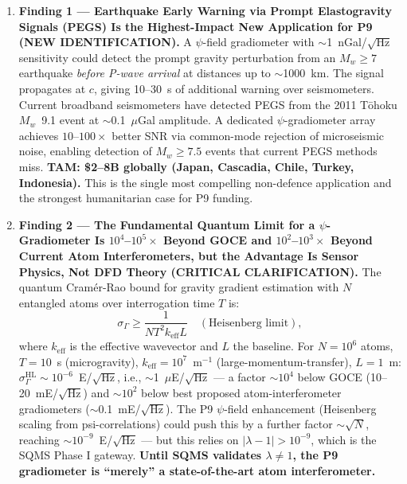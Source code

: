 \documentclass[11pt]{article}
\theoremstyle{definition}
\theoremstyle{remark}
\begin{document}
\begin{enumerate}
\item \textbf{Finding 1 --- Earthquake Early Warning via Prompt
  Elastogravity Signals (PEGS) Is the Highest-Impact New Application
  for P9 (NEW IDENTIFICATION).} A $\psi$-field gradiometer with
  $\sim$1~nGal/$\sqrt{\text{Hz}}$ sensitivity could detect the prompt
  gravity perturbation from an $M_w \geq 7$ earthquake \emph{before
  P-wave arrival} at distances up to $\sim$1000~km. The signal
  propagates at $c$, giving 10--30~s of additional warning over
  seismometers. Current broadband seismometers have detected PEGS
  from the 2011 T\={o}hoku $M_w$~9.1 event at $\sim$0.1~$\mu$Gal
  amplitude. A dedicated $\psi$-gradiometer array achieves
  $10$--$100\times$ better SNR via common-mode rejection of
  microseismic noise, enabling detection of $M_w \geq 7.5$ events
  that current PEGS methods miss. \textbf{TAM: \$2--8B globally
  (Japan, Cascadia, Chile, Turkey, Indonesia).} This is the
  single most compelling non-defence application and the strongest
  humanitarian case for P9 funding.

\item \textbf{Finding 2 --- The Fundamental Quantum Limit for a
  $\psi$-Gradiometer Is $10^4$--$10^5\times$ Beyond GOCE and
  $10^2$--$10^3\times$ Beyond Current Atom Interferometers, but the
  Advantage Is Sensor Physics, Not DFD Theory (CRITICAL CLARIFICATION).}
  The quantum Cram\'{e}r-Rao bound for gravity gradient estimation
  with $N$ entangled atoms over interrogation time $T$ is:
  \begin{equation}
    \sigma_{\Gamma} \geq \frac{1}{N T^2 k_{\text{eff}} L}
    \quad (\text{Heisenberg limit}),
  \end{equation}
  where $k_{\text{eff}}$ is the effective wavevector and $L$ the
  baseline. For $N = 10^6$ atoms, $T = 10$~s (microgravity),
  $k_{\text{eff}} = 10^7$~m$^{-1}$ (large-momentum-transfer),
  $L = 1$~m: $\sigma_\Gamma^{\text{HL}} \sim 10^{-6}$~E/$\sqrt{\text{Hz}}$,
  i.e., $\sim$1~$\mu$E/$\sqrt{\text{Hz}}$ --- a factor $\sim 10^4$
  below GOCE (10--20~mE/$\sqrt{\text{Hz}}$) and $\sim 10^2$ below
  best proposed atom-interferometer gradiometers
  ($\sim$0.1~mE/$\sqrt{\text{Hz}}$). The P9 $\psi$-field
  enhancement (Heisenberg scaling from psi-correlations) could push
  this by a further factor $\sim\sqrt{N}$, reaching
  $\sim 10^{-9}$~E/$\sqrt{\text{Hz}}$ --- but this relies on
  $|\lambda - 1| > 10^{-9}$, which is the SQMS Phase I gateway.
  \textbf{Until SQMS validates $\lambda \neq 1$, the P9 gradiometer
  is ``merely'' a state-of-the-art atom interferometer.}


\end{enumerate}
\end{document}
